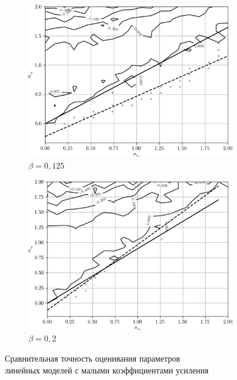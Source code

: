 \begin{figure}[p]
  \begin{subfigure}[b]{\linewidth}
    \centering
    \includegraphics[width=135mm]{fig/linear/param/beta-0,125_param-accs-approx.png}
    \caption{\( \beta = 0{,}125 \)}
  \end{subfigure}

  \vspace{2\baselineskip}
  \begin{subfigure}[b]{\linewidth}
    \centering
    \includegraphics[width=135mm]{fig/linear/param/beta-0,2_param-accs-approx.png}
    \caption{\( \beta = 0{,}2 \)}
  \end{subfigure}

  \vspace{\baselineskip}
  \caption{%
    Сравнительная точность оценивания параметров \\
    линейных моделей с малыми коэффициентами усиления
  }\label{fig:comparison_linear_params_beta-small}
\end{figure}

